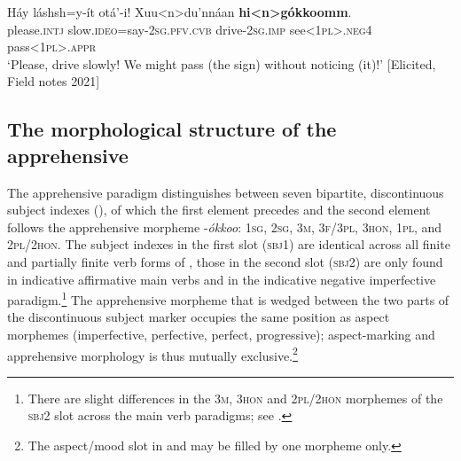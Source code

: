 \documentclass[output=paper,colorlinks,citecolor=brown,]{langscibook}
\begin{document}
\ea\label{ex:treis:4add}  
\gll Háy láshsh=y-ít otá'-i! Xuu<n>du'nnáan \textbf{hi<n>gókkoomm}.\\ 
please.\textsc{intj} slow.\textsc{ideo}=say-\textsc{2sg.pfv.cvb} drive-\textsc{2sg.imp} see\textsc{<1pl>.neg4} pass\textsc{<1pl>.appr} \\
\glt `Please, drive slowly! We might pass (the sign) without noticing (it)!'  [Elicited, Field notes 2021]
\z

\subsection{The morphological structure of the apprehensive}\label{sec:treis:2.2}

The apprehensive paradigm distinguishes between seven bipartite, discontinuous subject indexes (), of which the first element precedes and the second element follows the apprehensive morpheme \nobreakdash-\textit{ókkoo}: \textsc{1sg,} \textsc{2sg}, \textsc{3m}, \textsc{3f/3pl}, \textsc{3hon}, \textsc{1pl}, and \textsc{2pl/2hon}. The subject indexes in the first slot (\textsc{sbj1}) are identical across all finite and partially finite verb forms of , those in the second slot (\textsc{sbj2}) are only found in indicative affirmative main verbs and in the indicative negative imperfective paradigm.\footnote{There are slight differences in the \textsc{3m}, \textsc{3hon} and \textsc{2pl/2hon} morphemes of the \textsc{sbj2} slot across the main verb paradigms; see .}  The apprehensive morpheme that is wedged between the two parts of the discontinuous subject marker occupies the same position as aspect morphemes (imperfective, perfective, perfect, progressive); aspect-marking and apprehensive morphology is thus mutually exclusive.\footnote{The aspect\slash mood slot in  and  may be filled by one morpheme only.} 
\end{document}
